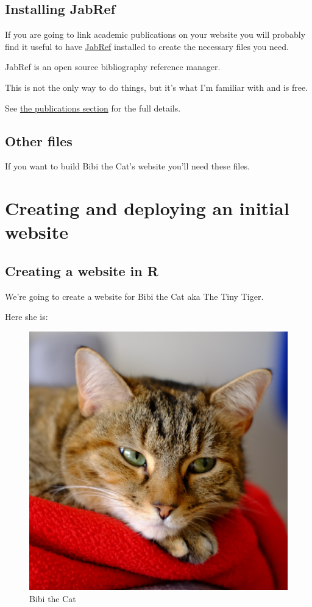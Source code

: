 \documentclass[12pt,]{book}
\theoremstyle{definition}
\theoremstyle{definition}
\theoremstyle{definition}
\theoremstyle{remark}
\begin{document}
\section{Installing JabRef}\label{installing-jabref}

If you are going to link academic publications on your website you will
probably find it useful to have \href{http://www.jabref.org/}{JabRef}
installed to create the necessary files you need.

JabRef is an open source bibliography reference manager.

This is not the only way to do things, but it's what I'm familiar with
and is free.

See \protect\hyperlink{creating-publication-files}{the publications
section} for the full details.

\section{Other files}\label{other-files}

If you want to build Bibi the Cat's website you'll need these files.

\chapter{Creating and deploying an initial
website}\label{creating-and-deploying-an-initial-website}

\section{Creating a website in R}\label{creating-a-website-in-r}

We're going to create a website for Bibi the Cat aka The Tiny Tiger.

Here she is:



\begin{figure}
\includegraphics[width=0.5\linewidth]{img/portrait} \caption{Bibi the Cat}\label{fig:bibi-cat}
\end{figure}
\end{document}
